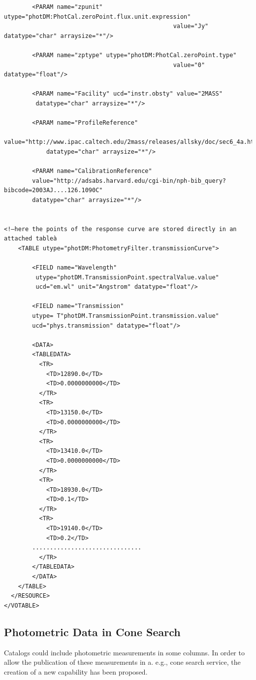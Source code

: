 \documentclass[11pt,a4paper]{ivoa}
\begin{document}
\begin{appendices}
\begin{verbatim}
        <PARAM name="zpunit" utype="photDM:PhotCal.zeroPoint.flux.unit.expression"
        										value="Jy" datatype="char" arraysize="*"/>

        <PARAM name="zptype" utype="photDM:PhotCal.zeroPoint.type"
        										value="0" datatype="float"/>

        <PARAM name="Facility" ucd="instr.obsty" value="2MASS"
         datatype="char" arraysize="*"/>

        <PARAM name="ProfileReference"
        value="http://www.ipac.caltech.edu/2mass/releases/allsky/doc/sec6_4a.html"
        	datatype="char" arraysize="*"/>

        <PARAM name="CalibrationReference"
        value="http://adsabs.harvard.edu/cgi-bin/nph-bib_query?bibcode=2003AJ....126.1090C"
        datatype="char" arraysize="*"/>


<!—here the points of the response curve are stored directly in an attached tableà
    <TABLE utype="photDM:PhotometryFilter.transmissionCurve">

        <FIELD name="Wavelength"
         utype="photDM.TransmissionPoint.spectralValue.value"
         ucd="em.wl" unit="Angstrom" datatype="float"/>

        <FIELD name="Transmission"
        utype= T"photDM.TransmissionPoint.transmission.value"
        ucd="phys.transmission" datatype="float"/>

        <DATA>
        <TABLEDATA>
          <TR>
            <TD>12890.0</TD>
            <TD>0.0000000000</TD>
          </TR>
          <TR>
            <TD>13150.0</TD>
            <TD>0.0000000000</TD>
          </TR>
          <TR>
            <TD>13410.0</TD>
            <TD>0.0000000000</TD>
          </TR>
          <TR>
            <TD>18930.0</TD>
            <TD>0.1</TD>
          </TR>
          <TR>
            <TD>19140.0</TD>
            <TD>0.2</TD>
        ...............................
          </TR>
        </TABLEDATA>
        </DATA>
    </TABLE>
  </RESOURCE>
</VOTABLE>

\end{verbatim}


\subsection{Photometric Data in Cone Search}
Catalogs could include photometric measurements in some columns. In order to allow the publication of these measurements in a. e.g., cone search service, the creation of a new capability has been proposed.
\par


\end{appendices}
\end{document}
